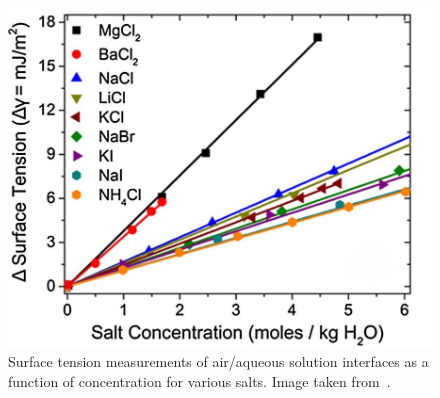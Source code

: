 \begin{figure}[tbhp!]
      \centering
      \includegraphics[width=0.7\linewidth]{images/ST_solute.jpg}
      \caption{Surface tension measurements of air/aqueous solution interfaces as a function of concentration for various salts. Image taken from~\cite{okur2017jones}. }\label{fig:surf_tens_solute}
\end{figure}